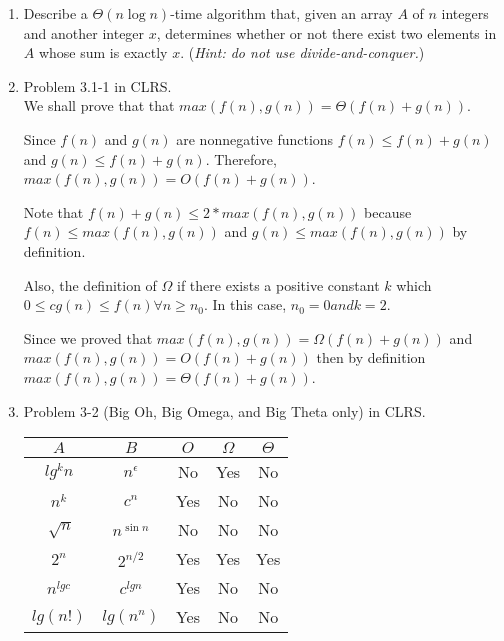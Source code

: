 \documentclass[letterpaper,11pt]{article}
\begin{document}




\begin{enumerate}
\item Describe a $\Theta(n\log n)$-time algorithm that, given an array $A$ of $n$ integers and another integer $x$, determines whether or not there exist two elements in $A$ whose sum is exactly $x$. (\emph{Hint: do not use divide-and-conquer.})

\item Problem 3.1-1 in CLRS. \\
We shall prove that that $max(f(n),g(n)) = \Theta(f(n)+g(n))$. 

Since $f(n)$ and $g(n)$ are nonnegative functions $f(n) \leq f(n)+g(n)$ and  $g(n) \leq f(n)+g(n)$. Therefore, $max(f(n),g(n)) = O(f(n)+g(n))$.

Note that $f(n) + g(n) \leq 2*max(f(n),g(n))$ because $f(n) \leq max(f(n),g(n))$ and
$g(n) \leq max(f(n),g(n))$ by definition.

Also, the definition of $\Omega$ if there exists a positive constant $k$ which $0 \leq cg(n) \leq f(n) \forall n \geq n_0$. In this case, $n_0 = 0 and k = 2$.

Since we proved that $max(f(n),g(n)) = \Omega(f(n)+g(n))$ and $max(f(n),g(n)) = O(f(n)+g(n))$ then by definition $max(f(n),g(n)) = \Theta(f(n)+g(n))$.

\item Problem 3-2 (Big Oh, Big Omega, and Big Theta only) in CLRS.


\begin{table}[h!]
\centering
 \begin{tabular}{|c c c c c|} 
 \hline
 $A$ & $B$ & $O$ & $\Omega$ & $\Theta$\\ [0.5ex] 
 \hline\hline
 $lg^{k}n$ &  $n^\epsilon$ & No & Yes & No\\ 
 $n^k$ & $c^n$ & Yes & No &No\\
 $\sqrt[]{n}$ & $n^{\sin{n}}$ & No & No &No\\
  $2^n$&  $2^{n/2}$ & Yes & Yes &Yes\\
$n^{lg{c}}$ & $c^{lg{n}}$ & Yes & No &No\\ 
$lg(n!)$ & $lg(n^n)$  & Yes & No &No\\[1ex] 
 \hline
 \end{tabular}
\end{table}



\end{enumerate}
\end{document}
